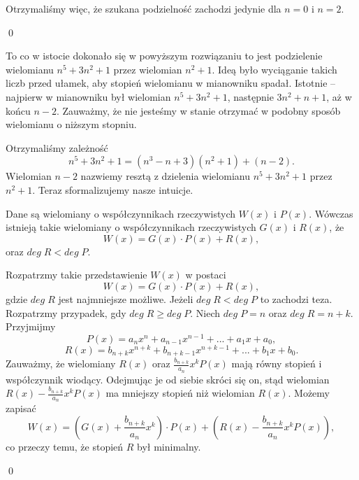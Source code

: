 \vspace{5px}

\noindent
Otrzymaliśmy więc, że szukana podzielność zachodzi jedynie dla $n = 0$ i $n = 2$.

\qed

\noindent 
To co w istocie dokonało się w powyższym rozwiązaniu to jest podzielenie wielomianu $n^5 + 3n^2 + 1$ przez wielomian $n^2 + 1$. Ideą było wyciąganie takich liczb przed ułamek, aby stopień wielomianu w mianowniku spadał. Istotnie -- najpierw w mianowniku był wielomian $n^5 + 3n^2 + 1$, następnie $3n^2 + n + 1$, aż w końcu $n - 2$. Zauważmy, że nie jesteśmy w stanie otrzymać w podobny sposób wielomianu o niższym stopniu.

\vspace{5px}
\noindent
Otrzymaliśmy zależność
\[
    n^5 + 3n^2 + 1 = (n^3 - n + 3)(n^2 + 1) + (n - 2).
\]
Wielomian $n - 2$ nazwiemy resztą z dzielenia wielomianu $n^5 + 3n^2 + 1$ przez $n^2 + 1$. Teraz sformalizujemy nasze intuicje.

\vspace{5px}


\noindent
Dane są wielomiany o współczynnikach rzeczywistych $W(x)$ i $P(x)$. Wówczas istnieją takie wielomiany o współczynnikach rzeczywistych $G(x)$ i $R(x)$, że
\[
    W(x) = G(x) \cdot P(x) + R(x),
\]
oraz $deg \; R < deg\; P$. 

\vspace{10px}


\noindent
Rozpatrzmy takie przedstawienie $W(x)$ w postaci
\[
    W(x) = G(x) \cdot P(x) + R(x),
\]
gdzie $deg \; R$ jest najmniejsze możliwe. Jeżeli $deg \; R < deg\; P$ to zachodzi teza. Rozpatrzmy przypadek, gdy $deg \; R \geqslant deg\; P$. Niech $deg \; P = n$ oraz $deg \; R = n + k$. Przyjmijmy
\[
    P(x) =  a_nx^n + a_{n - 1}x^{n - 1} + ... + a_1x + a_0,
\]
\[  
    R(x) = b_{n + k}x^{n + k} + b_{n + k - 1}x^{n + k - 1} + ... + b_1x + b_0.
\]
Zauważmy, że wielomiany $R(x)$ oraz $\frac{b_{n + k}}{a_n}x^kP(x)$ mają równy stopień i współczynnik wiodący. Odejmując je od siebie skróci się on, stąd wielomian $R(x) - \frac{b_{n + k}}{a_n}x^kP(x)$ ma mniejszy stopień niż wielomian $R(x)$. Możemy zapisać
\[
    W(x) = \left(G(x) + \frac{b_{n + k}}{a_n}x^k\right) \cdot  P(x) + \left(R(x) - \frac{b_{n + k}}{a_n}x^kP(x)\right),
\]
co przeczy temu, że stopień $R$ był minimalny.

\qed


